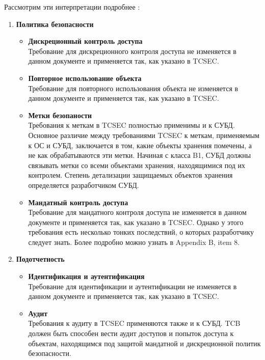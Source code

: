 Рассмотрим эти интерпретации подробнее \cite{PurpleBook}:
\begin{enumerate}
	\item \textbf{Политика безопасности}
	\begin{itemize}
		\item \textbf{Дискреционный контроль доступа}\\
		Требование для дискреционного контроля доступа не изменяется в данном документе и применяется так, как указано в TCSEC.
		\item \textbf{Повторное использование объекта}\\
		Требование для повторного использования объекта не изменяется в данном документе и применяется так, как указано в TCSEC.
		\item \textbf{Метки безопаности}\\
		Требования к меткам в TCSEC полностью применимы и к СУБД. Основное различие между требованиями TCSEC к меткам, применяемым к ОС и СУБД, заключается в том, какие объекты хранения помечены, а не как обрабатываются эти метки.
		Начиная с класса B1, СУБД должны связывать метки со всеми объектами хранения, находящимися под их контролем. Степень детализации защищаемых объектов хранения определяется разработчиком СУБД.
		\item \textbf{Мандатный контроль доступа}\\
		Требование для мандатного контроля доступа не изменяется в данном документе и применяется так, как указано в TCSEC. Однако у этого требования есть несколько тонких последствий, о которых разработчику следует знать. Более подробно можно узнать в \cite{PurpleBook} Appendix B, item 8.
	\end{itemize}
	\item \textbf{Подотчетность}
	\begin{itemize}
		\item \textbf{Идентификация и аутентификация}\\
		Требование для идентификации и аутентификации не изменяется в данном документе и применяется так, как указано в TCSEC.
		\item \textbf{Аудит}\\
		Требования к аудиту в TCSEC применяются также и к СУБД. TCB должен быть способен вести аудит доступов и попыток доступа к объектам, находящимся под защитой мандатной и дискреционной политик безопасности.
	\end{itemize}
\end{enumerate}


